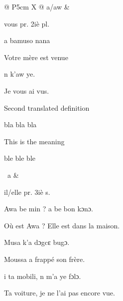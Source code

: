 @ P5cm X @ a/aw &

vous pr. 2iè pl.

a bamuso nana

Votre mère est venue

n k'aw ye.

Je vous ai vus.

Second translated definition

bla bla bla

This is the meaning

ble ble ble

\
a &

il/elle pr. 3iè s.

Awa be min ? a be bon kɔnɔ.

Où est Awa ? Elle est dans la maison.

Musa k'a dɔgcɛ bugɔ.

Moussa a frappé son frère.

i ta mobili, n m'a ye fɔlɔ.

Ta voiture, je ne l'ai pas encore vue.
